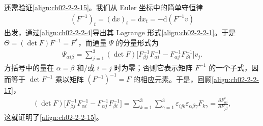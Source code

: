 ﻿\documentclass[../../main.tex]{subfiles}
\begin{document}
还需验证\eqref{align:ch02-2-2-15}。我们从 Euler 坐标中的简单守恒律
\begin{align}
(F^{-1})_{t}=(\mathrm{d}x)_{t}=\mathrm{d}x_{t}=-\mathrm{d}(F^{-1}v)
\label{align:ch02-2-2-18}
\end{align}
出发，通过\eqref{align:ch02-2-2-4}导出其 Lagrange 形式\eqref{align:ch02-2-2-1}。于是 $\Theta=(\det F)F^{-1}=F^{*}$，而通量 $\Psi$ 的分量形式为
\begin{align}
\Psi_{\alpha i\beta}=\sum_{j=1}^{3}(\det F)\bigl[F^{-1}_{\beta j}F^{-1}_{\alpha i}-F^{-1}_{\alpha j}F^{-1}_{\beta i}\bigr]v_{j}.
\label{align:ch02-2-2-19}
\end{align}
方括号中的量在 $\alpha=\beta$ 和/或 $i=j$ 时为零；否则它表示矩阵 $F^{-1}$ 的一个子式，因而等于 $\det F^{-1}$ 乘以矩阵 $(F^{-1})^{-1}=F$ 的相应元素。于是，回顾\eqref{align:ch02-2-2-17}，
\begin{align}
(\det F)\bigl[F^{-1}_{\beta j}F^{-1}_{\alpha i}-F^{-1}_{\alpha j}F^{-1}_{\beta i}\bigr]=\sum_{k=1}^{3}\sum_{\gamma=1}^{3}\varepsilon_{ijk}\varepsilon_{\alpha\beta\gamma}F_{k\gamma}=\frac{\partial F^{*}_{\alpha i}}{\partial F_{j\beta}},
\label{align:ch02-2-2-20}
\end{align}
这就证明了\eqref{align:ch02-2-2-15}。
\end{document}
